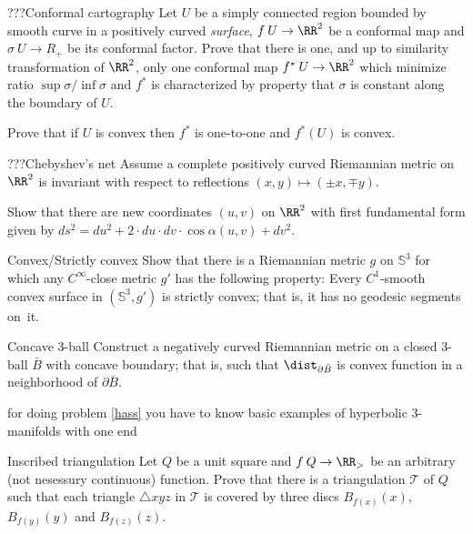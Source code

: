 \begin{pr}{}{???Conformal cartography}
Let $U$ be a simply connected region
bounded by smooth curve in a positively curved \emph{surface}, $f\:U\to \RR^2$
be a conformal map and $\sigma\:U\to R_+$ be its conformal factor.
Prove that there is one, and up to similarity transformation of $\RR^2$,
only one conformal map $f^*\:U\to \RR^2$ which minimize ratio
$\sup\sigma/\inf\sigma$ and $f^*$ is characterized by property that $\sigma$
is constant along the boundary of $U$.

Prove that if $U$ is convex then $f^*$
is one-to-one and $f^*(U)$ is convex.
\end{pr}

\begin{pr}{}{???Chebyshev's net}
Assume a complete positively curved Riemannian metric on $\RR^2$ is invariant with respect to reflections $(x,y)\mapsto (\pm x,\mp y)$.

Show that there are new coordinates $(u,v)$ on $\RR^2$ with first fundamental form given by
\def\d{d}
$\d s^2=\d u^2+2\cdot\d u\cdot\d v\cdot \cos\alpha(u,v)+\d v^2$.
\end{pr}

\begin{pr}{}{Convex/Strictly convex}\label{strict-convex} 
Show that there is a Riemannian metric $g$ on $\mathbb{S}^3$ for which any  $C^\infty$-close metric $g'$ has the following property: 
Every $C^1$-smooth convex surface in $(\mathbb{S}^3,g')$ is strictly convex; 
that is, it has no geodesic segments on~it.
\sign{}
\end{pr}

\begin{pr}{\thm}{Concave 3-ball}\label{hass}
Construct a negatively curved Riemannian metric on a closed 3-ball $\bar B$ with concave boundary; 
that is, such that  $\dist_{\partial \bar B}$ is convex function in a neighborhood of $\partial \bar B$.
\end{pr}
for doing problem \ref{hass} you have to know basic examples of hyperbolic 3-manifolds with one end








\begin{pr}{}{Inscribed triangulation}
Let $Q$ be a unit square and $f\:Q\to\RR_>$ be an arbitrary (not nesessury continuous) function.
Prove that there is a triangulation $\mathcal T$ of $Q$ such that each triangle $\triangle xyz$ in $\mathcal T$ is covered by three discs $B_{f(x)}(x)$, $B_{f(y)}(y)$ and $B_{f(z)}(z)$.
\end{pr}





